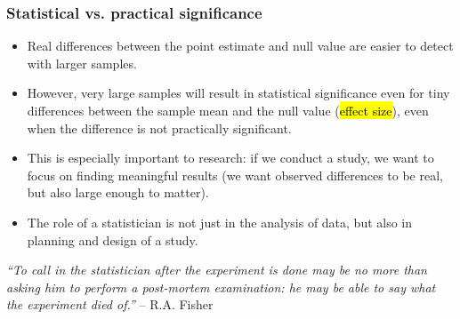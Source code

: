 \begin{frame}
\frametitle{Statistical vs. practical significance}

\begin{itemize}

\item Real differences between the point estimate and null value are easier to detect with larger samples.

\item However, very large samples will result in statistical significance even for tiny differences between the sample mean and the null value (\hl{effect size}), even when the difference is not practically significant.

\item This is especially important to research: if we conduct a study, we want to focus on finding meaningful results (we want observed differences to be real, but also large enough to matter).

\item The role of a statistician is not just in the analysis of data, but also in planning and design of a study.
\end{itemize}

\begin{center}{\footnotesize
\textit{``To call in the statistician after the experiment is done may be no more than asking him to perform a post-mortem examination: he may be able to say what the experiment died of.''} -- R.A. Fisher
}\end{center}

\end{frame}

